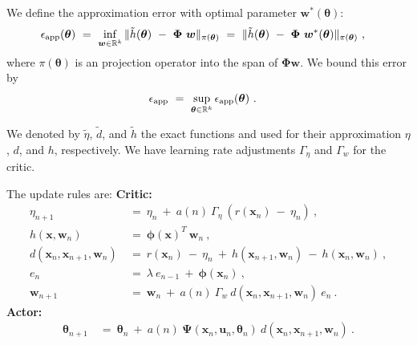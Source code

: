 \documentclass{article}
\newcommand\Bu{\bm{u}}
\newcommand\Bw{\bm{w}}
\newcommand\Bx{\bm{x}}
\newcommand\Bth{\bm{\theta}}
\newcommand\Bph{\bm{\phi}}
\newcommand\BPh{\bm{\Phi}}
\newcommand\BPs{\bm{\Psi}}
\begin{document}
We define the approximation error with optimal parameter $\Bw^{*}(\Bth)$:
\begin{align}
\epsilon_{\mathrm{app}}(\Bth) \ &= \ \inf_{\Bw \in \dR^k} \| \tilde{h}(\Bth)
\ - \ \BPh \ \Bw \|_{\pi(\Bth)} \ = \ \| \tilde{h}(\Bth)
\ - \ \BPh \ \Bw^{*}(\Bth) \|_{\pi(\Bth)} \ ,
\end{align}
where $\pi(\Bth)$ is an projection operator into the span of
$\BPh \Bw$.
We bound this error by
\begin{align}
\epsilon_{\mathrm{app}} \ &= \ \sup_{\Bth \in \dR^k}
 \epsilon_{\mathrm{app}}(\Bth) \ .
\end{align}

We denoted by $\tilde{\eta}$, $\tilde{d}$, and $\tilde{h}$ the exact
functions and used for their approximation $\eta$, $d$, and $h$,
respectively.
We have learning rate adjustments $\Gamma_{\eta}$ and $\Gamma_{w}$ for the
critic.

The update rules are:\newline
{\bf Critic:}
\begin{align}
\eta_{n+1} \ &= \ \eta_{n} \ + \ a(n) \ \Gamma_{\eta} \
(r(\Bx_n) \ - \ \eta_n) \ , \\
h(\Bx,\Bw_n) \ &= \ \Bph(\Bx)^T \ \Bw_n \ , \\
d(\Bx_n,\Bx_{n+1},\Bw_n) \ &= \
r(\Bx_n) \ - \ \eta_n
\ + \ h(\Bx_{n+1},\Bw_n) \ - \ h(\Bx_n,\Bw_n) \ , \\
e_n \ &= \ \lambda \ e_{n-1} \ + \  \Bph(\Bx_n) \ , \\
\Bw_{n+1} \ &= \ \Bw_{n} \ + \ a(n) \ \Gamma_{w} \
d(\Bx_n,\Bx_{n+1},\Bw_n) \ e_n \ .
\end{align}
{\bf Actor:}
\begin{align}
\Bth_{n+1} \ &= \ \Bth_{n} \ + \ a(n) \ \BPs(\Bx_n,\Bu_n,\Bth_n) \
d(\Bx_n,\Bx_{n+1},\Bw_n) \ .
\end{align}
\end{document}
